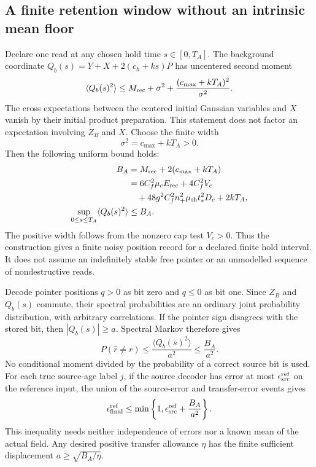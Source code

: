 \subsection{A finite retention window without an intrinsic mean floor}
\label{sec:chvidr-pointer-retention}

Declare one read at any chosen hold time $s\in[0,T_A]$. The background
coordinate $Q_b(s)=Y+X+2(c_h+ks)P$ has uncentered second moment
\begin{equation}
 \langle Q_b(s)^2\rangle
   \leq M_{\rm rec}+\sigma^2+
                     \frac{(c_{\max}+kT_A)^2}{\sigma^2}.
 \label{eq:chvidr-held-background-bound}
\end{equation}
The cross expectations between the centered initial Gaussian variables
and $X$ vanish by their initial product preparation. This statement does
not factor an expectation involving $Z_B$ and $X$.
Choose the finite width
\begin{equation}
 \sigma^2=c_{\max}+kT_A>0.
\end{equation}
Then the following uniform bound holds:
\begin{equation}
 \begin{aligned}
 B_A&=M_{\rm rec}+2(c_{\max}+kT_A)\\
    &=6C_f^2\mu_c E_{\rm rec}+4C_f^2V_c
       \\ &\quad+48g^2C_f^2n_+^2\mu_{\rm sh}t_*^2D_c+2kT_A,\\
 \sup_{0\leq s\leq T_A}\langle Q_b(s)^2\rangle&\leq B_A.
 \end{aligned}
 \label{eq:chvidr-rekeyed-memory-noise}
\end{equation}
The positive width follows from the nonzero cap test $V_c>0$. Thus the
construction gives a finite noisy position record for a declared finite
hold interval. It does not assume an indefinitely stable free pointer or
an unmodelled sequence of nondestructive reads.

Decode pointer positions $q>0$ as bit zero and $q\leq0$ as bit one.
Since $Z_B$ and $Q_b(s)$ commute, their spectral probabilities are an
ordinary joint probability distribution, with arbitrary correlations.
If the pointer sign disagrees with the stored bit, then
$|Q_b(s)|\geq a$. Spectral Markov therefore gives
\begin{equation}
 P(\widehat r\ne r)
       \leq\frac{\langle Q_b(s)^2\rangle}{a^2}
       \leq\frac{B_A}{a^2}.
 \label{eq:chvidr-bit-transfer-error}
\end{equation}
No conditional moment divided by the probability of a correct source bit
is used. For each true source-age label $j$, if the source decoder has
error at most $\epsilon_{\rm src}^{\rm ref}$ on the reference input,
the union of the source-error and transfer-error events gives
\begin{equation}
 \epsilon_{\rm final}^{\rm ref}
   \leq\min\left\{1,\epsilon_{\rm src}^{\rm ref}+\frac{B_A}{a^2}\right\}.
 \label{eq:chvidr-reference-total-error}
\end{equation}
This inequality needs neither independence of errors nor a known mean of
the actual field. Any desired positive transfer allowance $\eta$ has the
finite sufficient displacement $a\geq\sqrt{B_A/\eta}$.

